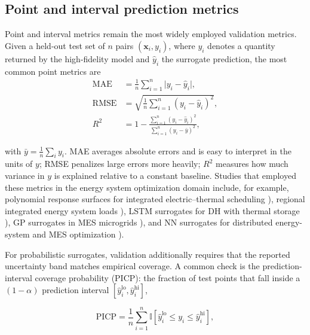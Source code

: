 \documentclass[final,5p,times,twocolumn]{elsarticle}
\begin{document}
\subsection{Point and interval prediction metrics}
\label{sec:val:point}

Point and interval metrics remain the most widely employed validation
metrics. Given a held-out test set of $n$ pairs $(\mathbf{x}_i, y_i)$,
where $y_i$ denotes a quantity returned by the high-fidelity model and
$\hat{y}_i$ the surrogate prediction, the most common point metrics are
$$\begin{align}
  \mathrm{MAE}  &= \frac{1}{n}\sum_{i=1}^{n}\lvert y_i - \hat{y}_i\rvert,
  \label{eq:mae} \\
  \mathrm{RMSE} &= \sqrt{\frac{1}{n}\sum_{i=1}^{n}(y_i - \hat{y}_i)^2},
  \label{eq:rmse} \\
  R^{2}         &= 1 - \frac{\sum_{i=1}^{n}(y_i - \hat{y}_i)^2}
                       {\sum_{i=1}^{n}(y_i - \bar{y})^2},
  \label{eq:r2}
\end{align}$$

with $\bar{y} = \frac{1}{n}\sum_i y_i$. MAE averages absolute errors and
is easy to interpret in the units of $y$; RMSE penalizes large errors
more heavily; $R^{2}$ measures how much variance in $y$ is explained
relative to a constant baseline. Studies that employed these metrics in
the energy system optimization domain include, for example, polynomial
response surfaces for integrated electric--thermal scheduling
\cite{Wang2020202933}), regional integrated energy system loads
\cite{Shi2024__2}), LSTM surrogates for DH with thermal storage \cite{Du2025}),
GP surrogates in MES microgrids \cite{Li2023__3}), and NN surrogates for
distributed energy-system and MES optimization
\cite{Perera2019191,Ren2024}).

For probabilistic surrogates, validation additionally requires that the
reported uncertainty band matches empirical coverage. A common check is
the prediction-interval coverage probability (PICP): the fraction of
test points that fall inside a $(1-\alpha)$ prediction interval
$[\hat{y}_i^{\mathrm{lo}},
\hat{y}_i^{\mathrm{hi}}]$,

$$\begin{equation}
  \mathrm{PICP} = \frac{1}{n}\sum_{i=1}^{n}
  \mathbb{I}\!\left[\hat{y}_i^{\mathrm{lo}} \le y_i \le
  \hat{y}_i^{\mathrm{hi}}\right],
  \label{eq:picp}
\end{equation}$$
\end{document}
